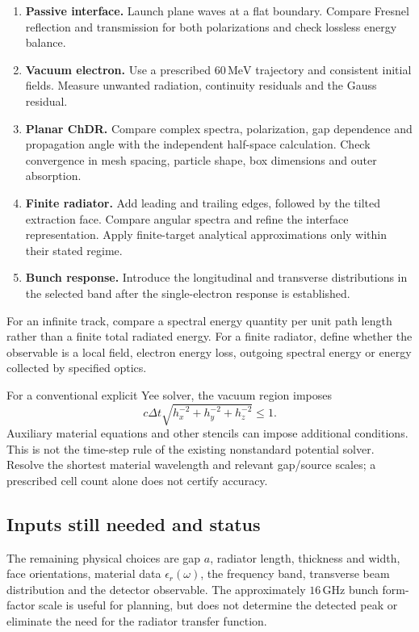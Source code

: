 \documentclass[11pt,a4paper]{article}
\newcommand{\unit}[1]{\,\mathrm{#1}}
\numberwithin{equation}{section}
\begin{document}
\begin{enumerate}[itemsep=5pt]
 \item \textbf{Passive interface.} Launch plane waves at a flat boundary.
       Compare Fresnel reflection and transmission for both polarizations
       and check lossless energy balance.
 \item \textbf{Vacuum electron.} Use a prescribed \(60\unit{MeV}\)
       trajectory and consistent initial fields. Measure unwanted radiation,
       continuity residuals and the Gauss residual.
 \item \textbf{Planar ChDR.} Compare complex spectra, polarization, gap
       dependence and propagation angle with the independent half-space
       calculation. Check convergence in mesh spacing, particle shape,
       box dimensions and outer absorption.
 \item \textbf{Finite radiator.} Add leading and trailing edges, followed
       by the tilted extraction face. Compare angular spectra and refine
       the interface representation. Apply finite-target analytical
       approximations only within their stated regime.
 \item \textbf{Bunch response.} Introduce the longitudinal and transverse
       distributions in the selected band after the single-electron
       response is established.
\end{enumerate}

For an infinite track, compare a spectral energy quantity per unit path
length rather than a finite total radiated energy. For a finite radiator,
define whether the observable is a local field, electron energy loss,
outgoing spectral energy or energy collected by specified optics.

For a conventional explicit Yee solver, the vacuum region imposes
\begin{equation}
 c\Delta t\sqrt{h_x^{-2}+h_y^{-2}+h_z^{-2}}\leq1.
\end{equation}
Auxiliary material equations and other stencils can impose additional
conditions. This is not the time-step rule of the existing nonstandard
potential solver. Resolve the shortest material wavelength and relevant
gap/source scales; a prescribed cell count alone does not certify accuracy.

\subsection{Inputs still needed and status}

The remaining physical choices are gap \(a\), radiator length, thickness
and width, face orientations, material data \(\epsilon_r(\omega)\), the
frequency band, transverse beam distribution and the detector observable.
The approximately \(16\unit{GHz}\) bunch form-factor scale is useful for
planning, but does not determine the detected peak or eliminate the
need for the radiator transfer function.
\end{document}
